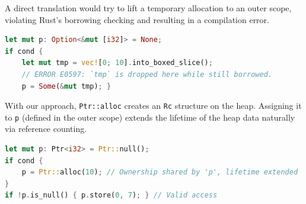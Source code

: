 \documentclass{llncs} %
\begin{document}
A direct translation would try to lift a temporary allocation to an
outer scope, violating Rust's borrowing checking and resulting in a
compilation error.
%
\begin{lstlisting}[language=Rust]
let mut p: Option<&mut [i32]> = None;
if cond {
    let mut tmp = vec![0; 10].into_boxed_slice();
    // ERROR E0597: `tmp` is dropped here while still borrowed.
    p = Some(&mut tmp); }
\end{lstlisting}

With our approach, \texttt{Ptr::alloc} creates an \texttt{Rc} structure on the heap. Assigning it to \texttt{p} (defined in the outer scope) extends the lifetime of the heap data naturally via reference counting.
%
\begin{lstlisting}[language=Rust]
let mut p: Ptr<i32> = Ptr::null();
if cond {
    p = Ptr::alloc(10); // Ownership shared by 'p', lifetime extended
}
if !p.is_null() { p.store(0, 7); } // Valid access
\end{lstlisting}





\end{document}
